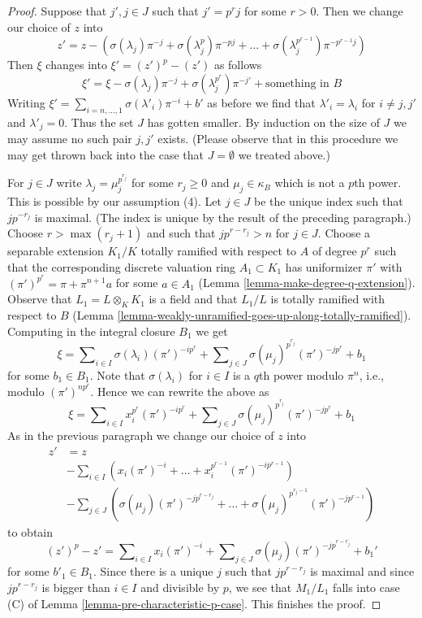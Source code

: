 \documentclass[10pt,a4paper]{amsart}
\theoremstyle{plain}
\theoremstyle{definition}
\theoremstyle{remark}
\numberwithin{equation}{subsection}
\begin{document}
\begin{proof}
\medskip\noindent
Suppose that $j', j \in J$ such that $j' = p^r j$ for some
$r > 0$. Then we change our choice of $z$ into
$$
z' = z -
(\sigma(\lambda_j) \pi^{-j} + \sigma(\lambda_j^p) \pi^{-pj} + \ldots +
\sigma(\lambda_j^{p^{r - 1}}) \pi^{-p^{r - 1}j})
$$
Then $\xi$ changes into $\xi' = (z')^p - (z')$ as follows
$$
\xi' =
\xi - \sigma(\lambda_j) \pi^{-j} + \sigma(\lambda_j^{p^r}) \pi^{-j'}
+ \text{something in }B
$$
Writing
$\xi' = \sum\nolimits_{i = n, \ldots, 1} \sigma(\lambda'_i) \pi^{-i} + b'$
as before we find that
$\lambda'_i = \lambda_i$ for $i \not = j, j'$ and $\lambda'_j = 0$.
Thus the set $J$ has gotten smaller.
By induction on the size of $J$ we may assume no such pair $j, j'$ exists.
(Please observe that in this procedure we may get thrown back into the case
that $J = \emptyset$ we treated above.)

\medskip\noindent
For $j \in J$ write $\lambda_j = \mu_j^{p^{r_j}}$ for some $r_j \geq 0$ and
$\mu_j \in \kappa_B$ which is not a $p$th power. This is possible by our
assumption (4). Let $j \in J$ be the unique index such that $j p^{-r_j}$
is maximal. (The index is unique by the result of the preceding paragraph.)
Choose $r > \max(r_j + 1)$ and such that $j p^{r - r_j} > n$ for $j \in J$.
Choose a separable extension $K_1/K$ totally ramified with respect to $A$
of degree $p^r$ such that the corresponding discrete valuation ring
$A_1 \subset K_1$ has uniformizer $\pi'$ with
$(\pi')^{p^r} = \pi + \pi^{n + 1}a$ for some $a \in A_1$
(Lemma \ref{lemma-make-degree-q-extension}).
Observe that $L_1 = L \otimes_K K_1$ is a field and that
$L_1/L$ is totally ramified with respect to $B$
(Lemma \ref{lemma-weakly-unramified-goes-up-along-totally-ramified}).
Computing in the integral closure $B_1$ we get
$$
\xi = \sum\nolimits_{i \in I} \sigma(\lambda_i) (\pi')^{-i p^r} +
\sum\nolimits_{j \in J} \sigma(\mu_j)^{p^{r_j}} (\pi')^{-j p^r} + b_1
$$
for some $b_1 \in B_1$. Note that $\sigma(\lambda_i)$ for $i \in I$
is a $q$th power modulo $\pi^n$, i.e., modulo $(\pi')^{n p^r}$.
Hence we can rewrite the above as
$$
\xi = \sum\nolimits_{i \in I} x_i^{p^r} (\pi')^{-i p^r} +
\sum\nolimits_{j \in J} \sigma(\mu_j)^{p^{r_j}} (\pi')^{- j p^r}
+ b_1
$$
As in the previous paragraph we change our choice of $z$ into
\begin{align*}
z' & = z \\
& -
\sum\nolimits_{i \in I}
\left(x_i (\pi')^{-i} + \ldots + x_i^{p^{r - 1}} (\pi')^{-i p^{r - 1}}\right)
\\
& -
\sum\nolimits_{j \in J}
\left(
\sigma(\mu_j) (\pi')^{- j p^{r - r_j}}
+ \ldots +
\sigma(\mu_j)^{p^{r_j - 1}} (\pi')^{- j p^{r - 1}}
\right)
\end{align*}
to obtain
$$
(z')^p - z' =
\sum\nolimits_{i \in I} x_i (\pi')^{-i} +
\sum\nolimits_{j \in J} \sigma(\mu_j) (\pi')^{- j p^{r - r_j}} + b_1'
$$
for some $b'_1 \in B_1$.
Since there is a unique $j$ such that $j p^{r - r_j}$ is maximal
and since $j p^{r - r_j}$ is bigger than $i \in I$ and divisible
by $p$, we see that $M_1 / L_1$ falls into case (C) of
Lemma \ref{lemma-pre-characteristic-p-case}.
This finishes the proof.
\end{proof}
\end{document}
